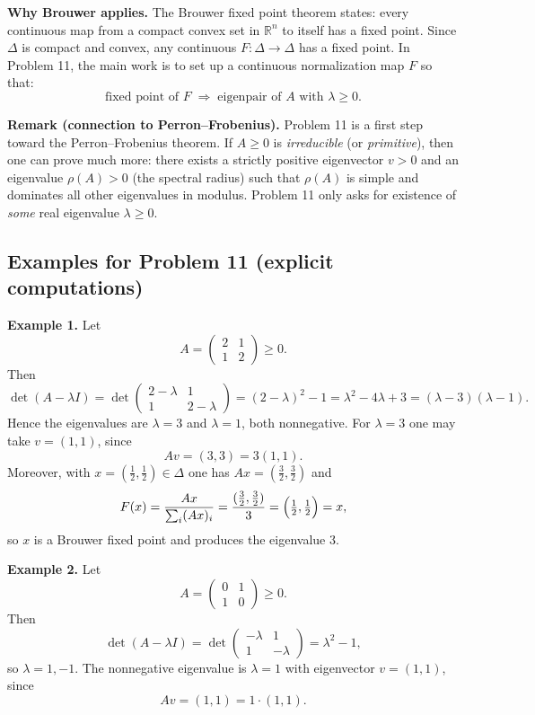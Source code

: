\documentclass[12pt,a4paper]{article}
\theoremstyle{plain}
\theoremstyle{definition}      %
\begin{document}
\medskip
\noindent\textbf{Why Brouwer applies.}
The Brouwer fixed point theorem states: every continuous map from a compact convex set in $\mathbb{R}^n$
to itself has a fixed point. Since $\Delta$ is compact and convex, any continuous $F:\Delta\to\Delta$ has a fixed point.
In Problem 11, the main work is to set up a continuous normalization map $F$ so that:
\[
\text{fixed point of $F$} \;\Longrightarrow\; \text{eigenpair of $A$ with $\lambda\ge 0$}.
\]

\medskip
\noindent\textbf{Remark (connection to Perron--Frobenius).}
Problem 11 is a first step toward the Perron--Frobenius theorem.
If $A\ge 0$ is \emph{irreducible} (or \emph{primitive}), then one can prove much more:
there exists a strictly positive eigenvector $v>0$ and an eigenvalue $\rho(A)>0$
(the spectral radius) such that $\rho(A)$ is simple and dominates all other eigenvalues in modulus.
Problem 11 only asks for existence of \emph{some} real eigenvalue $\lambda\ge 0$.

\subsection*{Examples for Problem 11 (explicit computations)}

\noindent\textbf{Example 1.}
Let
\[
A=\begin{pmatrix}2&1\\1&2\end{pmatrix}\ge 0.
\]
Then
\[
\det(A-\lambda I)=\det\begin{pmatrix}2-\lambda&1\\1&2-\lambda\end{pmatrix}
=(2-\lambda)^2-1=\lambda^2-4\lambda+3=(\lambda-3)(\lambda-1).
\]
Hence the eigenvalues are $\lambda=3$ and $\lambda=1$, both nonnegative.
For $\lambda=3$ one may take $v=(1,1)$, since
\[
Av=(3,3)=3(1,1).
\]
Moreover, with $x=(\tfrac12,\tfrac12)\in\Delta$ one has $Ax=(\tfrac32,\tfrac32)$ and
\[
F(x)=\frac{Ax}{\sum_i (Ax)_i}=\frac{(\tfrac32,\tfrac32)}{3}=\Bigl(\tfrac12,\tfrac12\Bigr)=x,
\]
so $x$ is a Brouwer fixed point and produces the eigenvalue $3$.

\medskip
\noindent\textbf{Example 2.}
Let
\[
A=\begin{pmatrix}0&1\\1&0\end{pmatrix}\ge 0.
\]
Then
\[
\det(A-\lambda I)=\det\begin{pmatrix}-\lambda&1\\1&-\lambda\end{pmatrix}=\lambda^2-1,
\]
so $\lambda=1,-1$. The nonnegative eigenvalue is $\lambda=1$ with eigenvector $v=(1,1)$, since
\[
Av=(1,1)=1\cdot(1,1).
\]
\end{document}
